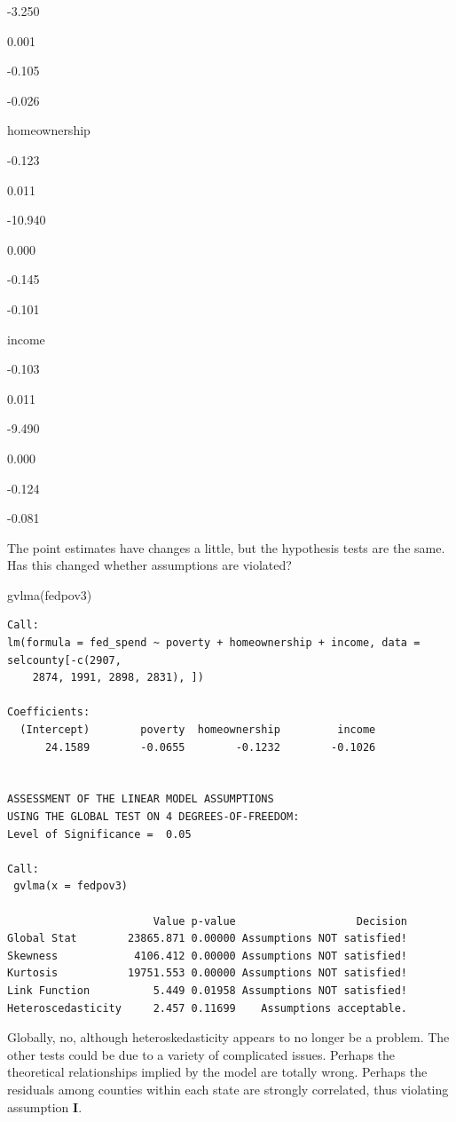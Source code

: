 \documentclass[
]{book}
\makeatletter
\newenvironment{Shaded}{\begin{snugshade}}{\end{snugshade}}
\newcommand{\FunctionTok}[1]{\textcolor[rgb]{0,0,0}{#1}}
\newcommand{\NormalTok}[1]{#1}
\newenvironment{kframe}{%
\medskip{}
\setlength{\fboxsep}{.8em}
 \def\at@end@of@kframe{}%
 \ifinner\ifhmode%
  \def\at@end@of@kframe{\end{minipage}}%
  \begin{minipage}{\columnwidth}%
 \fi\fi%
 \def\FrameCommand##1{\hskip\@totalleftmargin \hskip-\fboxsep
 \colorbox{shadecolor}{##1}\hskip-\fboxsep
     \hskip-\linewidth \hskip-\@totalleftmargin \hskip\columnwidth}%
 \MakeFramed {\advance\hsize-\width
   \@totalleftmargin\z@ \linewidth\hsize
   \@setminipage}}%
 {\par\unskip\endMakeFramed%
 \at@end@of@kframe}
\renewenvironment{Shaded}{\begin{kframe}}{\end{kframe}}
\makeatother
\begin{document}
-3.250

0.001

-0.105

-0.026

homeownership

-0.123

0.011

-10.940

0.000

-0.145

-0.101

income

-0.103

0.011

-9.490

0.000

-0.124

-0.081

The point estimates have changes a little, but the hypothesis tests are the same. Has this changed whether assumptions are violated?

\begin{Shaded}
\begin{Highlighting}[]
\FunctionTok{gvlma}\NormalTok{(fedpov3)}
\end{Highlighting}
\end{Shaded}

\begin{verbatim}
Call:
lm(formula = fed_spend ~ poverty + homeownership + income, data = selcounty[-c(2907, 
    2874, 1991, 2898, 2831), ])

Coefficients:
  (Intercept)        poverty  homeownership         income  
      24.1589        -0.0655        -0.1232        -0.1026  


ASSESSMENT OF THE LINEAR MODEL ASSUMPTIONS
USING THE GLOBAL TEST ON 4 DEGREES-OF-FREEDOM:
Level of Significance =  0.05 

Call:
 gvlma(x = fedpov3) 

                       Value p-value                   Decision
Global Stat        23865.871 0.00000 Assumptions NOT satisfied!
Skewness            4106.412 0.00000 Assumptions NOT satisfied!
Kurtosis           19751.553 0.00000 Assumptions NOT satisfied!
Link Function          5.449 0.01958 Assumptions NOT satisfied!
Heteroscedasticity     2.457 0.11699    Assumptions acceptable.
\end{verbatim}

Globally, no, although heteroskedasticity appears to no longer be a problem. The other tests could be due to a variety of complicated issues. Perhaps the theoretical relationships implied by the model are totally wrong. Perhaps the residuals among counties within each state are strongly correlated, thus violating assumption \textbf{I}.
\end{document}
